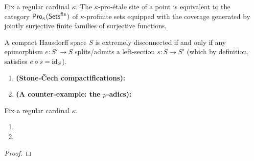             \begin{remark} \label{remark: condensation_and_profiniteness}
                Fix a regular cardinal $\kappa$. The $\kappa$-pro-\'etale site of a point is equivalent to the category $\mathsf{Pro}_{\kappa}(\mathsf{Sets}^{\mathrm{fin}})$ of $\kappa$-profinite sets equipped with the coverage generated by jointly surjective finite families of surjective functions. 
            \end{remark}
            
            \begin{definition} \label{def: extrememly_disconnected_sets}
                A compact Hausdorff space $S$ is extremely disconnected if and only if any epimorphism $e: S' \to S$ splits/admits a left-section $s: S \to S'$ (which by definition, satisfies $e \circ s = \mathrm{id}_S$).  
            \end{definition}
            \begin{example}
                \noindent
                \begin{enumerate}
                    \item \textbf{(Stone-\v{C}ech compactifications):}
                    \item \textbf{(A counter-example: the $p$-adics):}
                \end{enumerate}
            \end{example}
            
            \begin{lemma} \label{lemma: condensed_sets_and_extremely_disconnected_sets}
                Fix a regular cardinal $\kappa$. 
                \begin{enumerate}
                    \item 
                    \item 
                \end{enumerate}
            \end{lemma}
                \begin{proof}
                    
                \end{proof}
            
